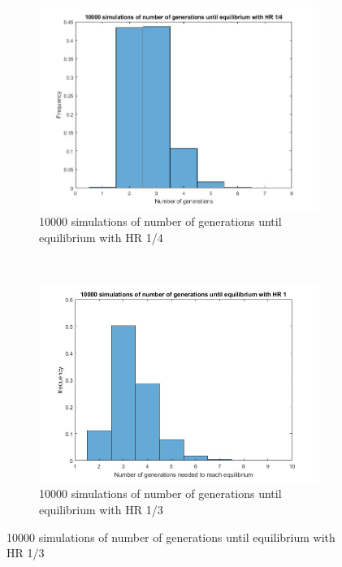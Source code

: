 \begin{figure}[ht]
	
    \centering
    \begin{subfigure}[t]{0.4\textwidth}
        \includegraphics[width=\textwidth]{GenormHistogramAantalgen4}
        \caption{10000 simulations of number of generations until equilibrium with HR 1/4}
        \label{fig:gull}
    \end{subfigure}
    ~ %
    \begin{subfigure}[t]{0.4\textwidth}
        \includegraphics[width=\textwidth]{GenormHistogramAantalgen}
        \caption{10000 simulations of number of generations until equilibrium with HR 1/3}

\end{subfigure}
\end{figure}
